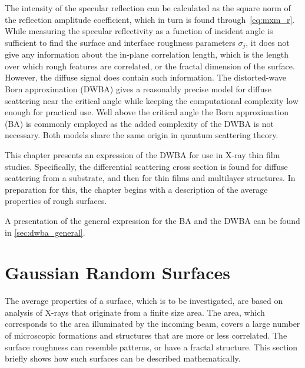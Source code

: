 \documentclass[10pt,twoside, b5paper,pdftex]{report}
\begin{document}
The intensity of the specular reflection  can be calculated as the square norm of the reflection amplitude coefficient, which in turn is found through~\cref{eq:mxm_r}. While measuring the specular reflectivity as a function of incident angle is sufficient to find the surface and interface roughness parameters $\sigma_{j}$, it does not give any information about the in-plane correlation length, which is the length over which rough features are correlated, or the fractal dimension of the surface. However, the diffuse signal does contain such information. The distorted-wave Born approximation (DWBA) gives a reasonably precise model for diffuse scattering near the critical angle while keeping the computational complexity low enough for practical use. Well above the critical angle the  Born approximation (BA) is commonly employed as the added complexity of the DWBA is not necessary. Both models share the same origin in quantum scattering theory.

This chapter presents an expression of the DWBA for use in X-ray thin film studies. 
Specifically, the  differential scattering cross section is found for diffuse scattering from a substrate, and then for thin films and multilayer structures. 
In preparation for this, the chapter begins with a description of the average properties of rough surfaces.

A presentation of the general expression for the BA and the DWBA can be found in \cref{sec:dwba_general}.  %





\section{Gaussian Random Surfaces}
The average properties of a surface, which is to be investigated, are based on analysis of X-rays that originate from a finite size area. The area, which corresponds to the area illuminated by the incoming beam, covers a large number of microscopic formations and structures that are more or less correlated. The surface roughness can resemble patterns, or have a fractal structure. This section briefly shows how such surfaces can be described mathematically.
\end{document}
